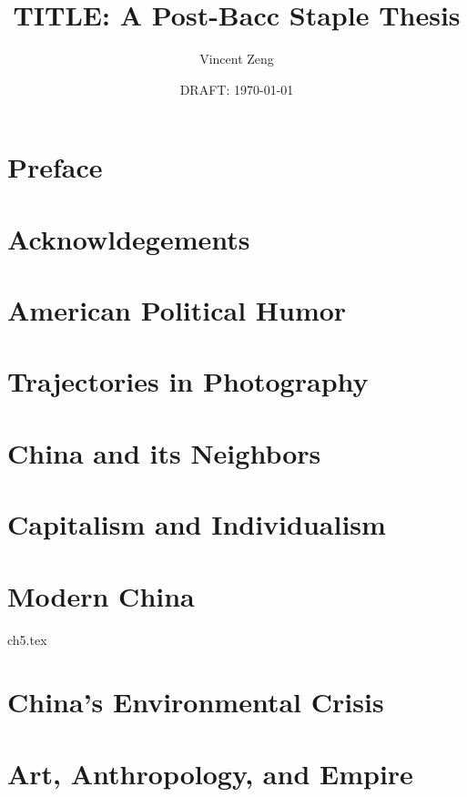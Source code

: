\documentclass{book}[10pt,openany,twoside]
\begin{document}
\title{TITLE: A Post-Bacc Staple Thesis}
\author{Vincent Zeng}
\date{DRAFT: \today}

\frontmatter

\maketitle
\tableofcontents

\chapter{Preface}


\chapter{Acknowldegements}



\mainmatter

\chapter{American Political Humor}


\chapter{Trajectories in Photography}


\chapter{China and its Neighbors}


\chapter{Capitalism and Individualism}


\chapter{Modern China}
 {ch5.tex}

\chapter{China's Environmental Crisis}


\chapter{Art, Anthropology, and Empire}

\end{document}
